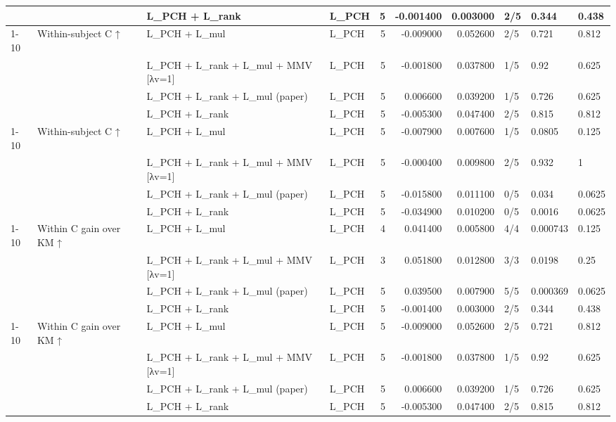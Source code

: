 \begin{tabular}{llllrrrlll}
 &  & L\_PCH + L\_rank & L\_PCH & 5 & -0.001400 & 0.003000 & 2/5 & 0.344 & 0.438 \\
\cline{1-10} \cline{2-10}
\multirow[t]{4}{*}{hsa\_synthetic} & \multirow[t]{4}{*}{Within-subject C ↑} & L\_PCH + L\_mul & L\_PCH & 5 & -0.009000 & 0.052600 & 2/5 & 0.721 & 0.812 \\
 &  & L\_PCH + L\_rank + L\_mul + MMV [λv=1] & L\_PCH & 5 & -0.001800 & 0.037800 & 1/5 & 0.92 & 0.625 \\
 &  & L\_PCH + L\_rank + L\_mul (paper) & L\_PCH & 5 & 0.006600 & 0.039200 & 1/5 & 0.726 & 0.625 \\
 &  & L\_PCH + L\_rank & L\_PCH & 5 & -0.005300 & 0.047400 & 2/5 & 0.815 & 0.812 \\
\cline{1-10} \cline{2-10}
\multirow[t]{4}{*}{sim\_base} & \multirow[t]{4}{*}{Within-subject C ↑} & L\_PCH + L\_mul & L\_PCH & 5 & -0.007900 & 0.007600 & 1/5 & 0.0805 & 0.125 \\
 &  & L\_PCH + L\_rank + L\_mul + MMV [λv=1] & L\_PCH & 5 & -0.000400 & 0.009800 & 2/5 & 0.932 & 1 \\
 &  & L\_PCH + L\_rank + L\_mul (paper) & L\_PCH & 5 & -0.015800 & 0.011100 & 0/5 & 0.034 & 0.0625 \\
 &  & L\_PCH + L\_rank & L\_PCH & 5 & -0.034900 & 0.010200 & 0/5 & 0.0016 & 0.0625 \\
\cline{1-10} \cline{2-10}
\multirow[t]{4}{*}{ebmt} & \multirow[t]{4}{*}{Within C gain over KM ↑} & L\_PCH + L\_mul & L\_PCH & 4 & 0.041400 & 0.005800 & 4/4 & 0.000743 & 0.125 \\
 &  & L\_PCH + L\_rank + L\_mul + MMV [λv=1] & L\_PCH & 3 & 0.051800 & 0.012800 & 3/3 & 0.0198 & 0.25 \\
 &  & L\_PCH + L\_rank + L\_mul (paper) & L\_PCH & 5 & 0.039500 & 0.007900 & 5/5 & 0.000369 & 0.0625 \\
 &  & L\_PCH + L\_rank & L\_PCH & 5 & -0.001400 & 0.003000 & 2/5 & 0.344 & 0.438 \\
\cline{1-10} \cline{2-10}
\multirow[t]{4}{*}{hsa\_synthetic} & \multirow[t]{4}{*}{Within C gain over KM ↑} & L\_PCH + L\_mul & L\_PCH & 5 & -0.009000 & 0.052600 & 2/5 & 0.721 & 0.812 \\
 &  & L\_PCH + L\_rank + L\_mul + MMV [λv=1] & L\_PCH & 5 & -0.001800 & 0.037800 & 1/5 & 0.92 & 0.625 \\
 &  & L\_PCH + L\_rank + L\_mul (paper) & L\_PCH & 5 & 0.006600 & 0.039200 & 1/5 & 0.726 & 0.625 \\
 &  & L\_PCH + L\_rank & L\_PCH & 5 & -0.005300 & 0.047400 & 2/5 & 0.815 & 0.812 \\

\end{tabular}
